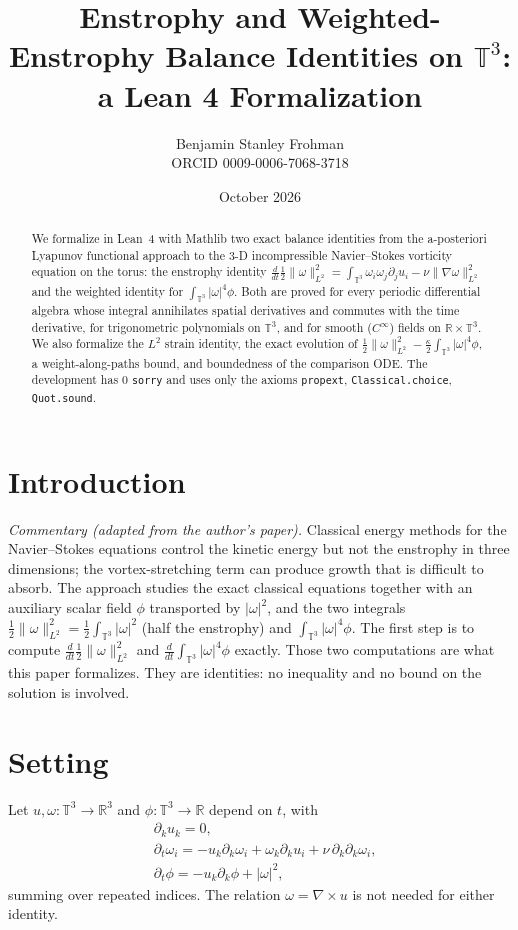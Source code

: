 \documentclass[11pt]{article}
\title{Enstrophy and Weighted-Enstrophy Balance Identities on $\mathbb{T}^3$:\\ a Lean 4 Formalization}
\author{Benjamin Stanley Frohman\\ ORCID 0009-0006-7068-3718}
\date{October 2026}
\begin{document}
\maketitle
\begin{abstract}
We formalize in Lean~4 with Mathlib two exact balance identities from the a-posteriori Lyapunov
functional approach to the 3-D incompressible Navier--Stokes vorticity equation on the torus:
the enstrophy identity $\frac{d}{dt}\frac12\|\omega\|_{L^2}^2=\int_{\mathbb{T}^3}\omega_i\omega_j\partial_ju_i-\nu\|\nabla\omega\|_{L^2}^2$ and the weighted identity for
$\int_{\mathbb{T}^3}|\omega|^4\phi$. Both are proved for every periodic differential algebra whose integral
annihilates spatial derivatives and commutes with the time derivative, for trigonometric polynomials on $\mathbb{T}^3$, and for smooth ($C^\infty$) fields on
$\mathbb{R}\times\mathbb{T}^3$. We also formalize the $L^2$ strain identity, the exact evolution of
$\frac12\|\omega\|_{L^2}^2-\frac{\kappa}{2}\int_{\mathbb{T}^3}|\omega|^4\phi$, a weight-along-paths bound, and boundedness of the comparison ODE. The development has $0$ \texttt{sorry} and uses only
the axioms \texttt{propext}, \texttt{Classical.choice}, \texttt{Quot.sound}.
\end{abstract}

\section{Introduction}
\emph{Commentary (adapted from the author's paper).} Classical energy methods for the
Navier--Stokes equations control the kinetic energy but not the enstrophy in three dimensions;
the vortex-stretching term can produce growth that is difficult to absorb. The approach studies
the exact classical equations together with an auxiliary scalar field $\phi$ transported by
$|\omega|^2$, and the two integrals $\tfrac12\|\omega\|_{L^2}^2=\tfrac12\int_{\mathbb{T}^3}|\omega|^2$ (half the enstrophy) and $\int_{\mathbb{T}^3}|\omega|^4\phi$. The first
step is to compute $\frac{d}{dt}\tfrac12\|\omega\|_{L^2}^2$ and $\frac{d}{dt}\int_{\mathbb{T}^3}|\omega|^4\phi$ exactly. Those two computations are what this paper
formalizes. They are identities: no inequality and no bound on the solution is involved.

\section{Setting}
Let $u,\omega:\mathbb{T}^3\to\mathbb{R}^3$ and $\phi:\mathbb{T}^3\to\mathbb{R}$ depend on $t$, with
\begin{align}
&\partial_k u_k=0, \label{div}\\
&\partial_t\omega_i=-u_k\partial_k\omega_i+\omega_k\partial_k u_i+\nu\,\partial_k\partial_k\omega_i,\label{vort}\\
&\partial_t\phi=-u_k\partial_k\phi+|\omega|^2,\label{wt}
\end{align}
summing over repeated indices. The relation $\omega=\nabla\times u$ is not needed for either identity.
\end{document}
